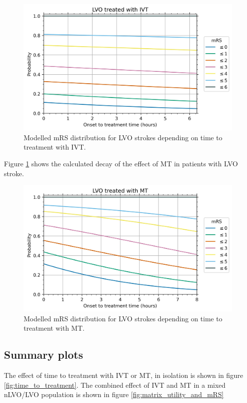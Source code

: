 {{\begin{figure}[h!]
    \centering
    \includegraphics[width=0.65\linewidth]{images/probs_with_time_LVO_treated_with_IVT}
    \caption{Modelled mRS distribution for LVO strokes depending on time to treatment with IVT.}
    \label{fig:probs_with_time_LVO_treated_with_IVT}
\end{figure}

Figure \ref{fig:probs_with_time_LVO_treated_with_IVT} shows the calculated decay of the effect of MT in patients with LVO stroke.

\begin{figure}[h!]
    \centering
    \includegraphics[width=0.65\linewidth]{images/probs_with_time_LVO_treated_with_MT}
    \caption{Modelled mRS distribution for LVO strokes depending on time to treatment with MT.}
    \label{fig:probs_with_time_LVO_treated_with_MT}
\end{figure}

\subsection{Summary plots}

The effect of time to treatment with IVT or MT, in isolation is shown in figure \ref{fig:time_to_treatment}. The combined effect of IVT and MT in a mixed nLVO/LVO population is shown in figure \ref{fig:matrix_utility_and_mRS}

}}
